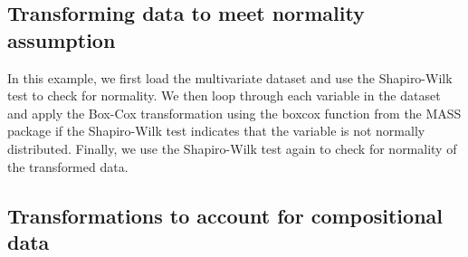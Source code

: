 \documentclass[
]{book}
\newenvironment{Shaded}{\begin{snugshade}}{\end{snugshade}}
\newcommand{\CommentTok}[1]{\textcolor[rgb]{0.56,0.35,0.01}{\textit{#1}}}
\newcommand{\ControlFlowTok}[1]{\textcolor[rgb]{0.13,0.29,0.53}{\textbf{#1}}}
\newcommand{\DecValTok}[1]{\textcolor[rgb]{0.00,0.00,0.81}{#1}}
\newcommand{\FloatTok}[1]{\textcolor[rgb]{0.00,0.00,0.81}{#1}}
\newcommand{\FunctionTok}[1]{\textcolor[rgb]{0.00,0.00,0.00}{#1}}
\newcommand{\NormalTok}[1]{#1}
\newcommand{\OtherTok}[1]{\textcolor[rgb]{0.56,0.35,0.01}{#1}}
\newcommand{\SpecialCharTok}[1]{\textcolor[rgb]{0.00,0.00,0.00}{#1}}
\newcommand{\StringTok}[1]{\textcolor[rgb]{0.31,0.60,0.02}{#1}}
\begin{document}
\hypertarget{transforming-data-to-meet-normality-assumption}{%
\subsection*{Transforming data to meet normality assumption}\label{transforming-data-to-meet-normality-assumption}}

In this example, we first load the multivariate dataset and use the Shapiro-Wilk test to check for normality. We then loop through each variable in the dataset and apply the Box-Cox transformation using the boxcox function from the MASS package if the Shapiro-Wilk test indicates that the variable is not normally distributed. Finally, we use the Shapiro-Wilk test again to check for normality of the transformed data.

\begin{Shaded}
\end{Shaded}

\hypertarget{data-transformation-compositional}{%
\subsection{Transformations to account for compositional data}\label{data-transformation-compositional}}
\end{document}
